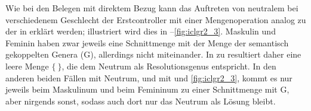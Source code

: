 Wie bei den Belegen mit direktem Bezug kann das Auftreten von neutralem
 bei verschiedenem Geschlecht der Erstcontroller mit einer
Mengenoperation analog zu der in  erklärt werden; illustriert
wird dies in --\ref{fig:iclgr2_3}. Maskulin und Feminin
haben zwar jeweils eine Schnittmenge mit der Menge der semantisch gekoppelten
Genera (G), allerdings nicht miteinander. In  zu
 resultiert daher eine leere Menge $\{\ \}$, die dem Neutrum
als Resolutionsgenus entspricht. In den anderen beiden Fällen mit Neutrum,
 und  mit  und
\ref{fig:iclgr2_3}, kommt es nur jeweils beim Maskulinum und beim Femininum zu
einer Schnittmenge mit G, aber nirgends sonst, sodass auch dort nur das
Neutrum als Lösung bleibt.

